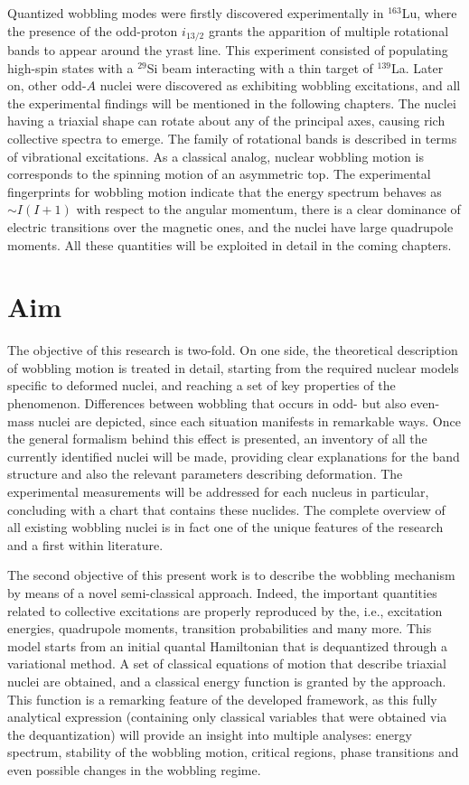 Quantized wobbling modes were firstly discovered experimentally in $^{163}$Lu, where the presence of the odd-proton $i_{13/2}$ grants the apparition of multiple rotational bands to appear around the yrast line. This experiment consisted of populating high-spin states with a $^{29}$Si beam interacting with a thin target of $^{139}$La. Later on, other odd-$A$ nuclei were discovered as exhibiting wobbling excitations, and all the experimental findings will be mentioned in the following chapters. The nuclei having a triaxial shape can rotate about any of the principal axes, causing rich collective spectra to emerge. The family of rotational bands is described in terms of vibrational excitations. As a classical analog, nuclear wobbling motion is corresponds to the spinning motion of an asymmetric top. The experimental fingerprints for wobbling motion indicate that the energy spectrum behaves as $\sim I(I+1)$ with respect to the angular momentum, there is a clear dominance of electric transitions over the magnetic ones, and the nuclei have large quadrupole moments. All these quantities will be exploited in detail in the coming chapters.

\section{Aim}
 
The objective of this research is two-fold. On one side, the theoretical description of wobbling motion is treated in detail, starting from the required nuclear models specific to deformed nuclei, and reaching a set of key properties of the phenomenon. Differences between wobbling that occurs in odd- but also even-mass nuclei are depicted, since each situation manifests in remarkable ways. Once the general formalism behind this effect is presented, an inventory of all the currently identified nuclei will be made, providing clear explanations for the band structure and also the relevant parameters describing deformation. The experimental measurements will be addressed for each nucleus in particular, concluding with a chart that contains these nuclides. The complete overview of all existing wobbling nuclei is in fact one of the unique features of the research and a first within literature.

The second objective of this present work is to describe the wobbling mechanism by means of a novel semi-classical approach. Indeed, the important quantities related to collective excitations are properly reproduced by the, i.e., excitation energies, quadrupole moments, transition probabilities and many more. This model starts from an initial quantal Hamiltonian that is dequantized through a variational method. A set of classical equations of motion that describe triaxial nuclei are obtained, and a classical energy function is granted by the approach. This function is a remarking feature of the developed framework, as this fully analytical expression (containing only classical variables that were obtained via the dequantization) will provide an insight into multiple analyses: energy spectrum, stability of the wobbling motion, critical regions, phase transitions and even possible changes in the wobbling regime. 

